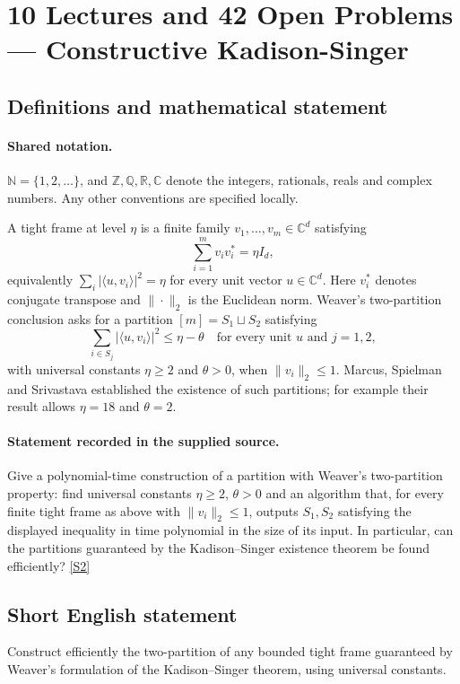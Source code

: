 \documentclass[11pt]{article}
\newcommand{\sref}[2]{\hyperlink{source:#1:#2}{[S#2]}}
\begin{document}
\section{10 Lectures and 42 Open Problems — Constructive Kadison-Singer}\label{statement}

\subsection{Definitions and mathematical statement}

\paragraph{Shared notation.}$\mathbb N=\{1,2,\ldots\}$, and $\mathbb Z,\mathbb Q,\mathbb R,\mathbb C$ denote the integers, rationals, reals and complex numbers. Any other conventions are specified locally.


A tight frame at level \(\eta\) is a finite family \(v_1,\ldots,v_m\in\mathbb C^d\) satisfying
\[\sum_{i=1}^m v_i v_i^*=\eta I_d,\]
equivalently \(\sum_i|\langle u,v_i\rangle|^2=\eta\) for every unit vector \(u\in\mathbb C^d\). Here \(v_i^*\) denotes conjugate transpose and \(\|\cdot\|_2\) is the Euclidean norm. Weaver's two-partition conclusion asks for a partition \([m]=S_1\sqcup S_2\) satisfying
\[\sum_{i\in S_j}|\langle u,v_i\rangle|^2\le\eta-\theta
\quad\text{for every unit }u\text{ and }j=1,2,\]
with universal constants \(\eta\ge2\) and \(\theta>0\), when \(\|v_i\|_2\le1\). Marcus, Spielman and Srivastava established the existence of such partitions; for example their result allows \(\eta=18\) and \(\theta=2\).
\paragraph{Statement recorded in the supplied source.}
Give a polynomial-time construction of a partition with Weaver's two-partition property: find universal constants \(\eta\ge2\), \(\theta>0\) and an algorithm that, for every finite tight frame as above with \(\|v_i\|_2\le1\), outputs \(S_1,S_2\) satisfying the displayed inequality in time polynomial in the size of its input. In particular, can the partitions guaranteed by the Kadison--Singer existence theorem be found efficiently? \sref{statement}{2}
\subsection{Short English statement}
Construct efficiently the two-partition of any bounded tight frame guaranteed by Weaver’s formulation of the Kadison–Singer theorem, using universal constants.
\end{document}

